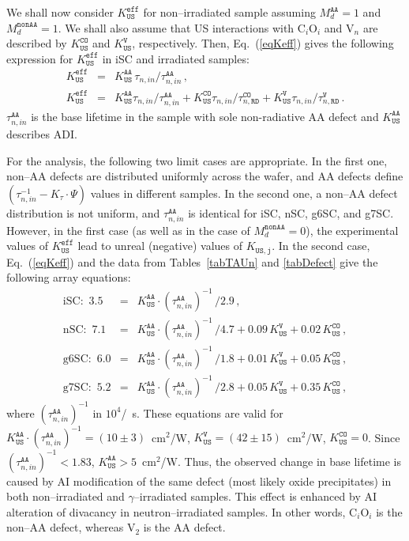 \documentclass[aip,jap, amsmath,amssymb,reprint]{revtex4-1}
\begin{document}
We shall now consider $K_\mathtt{US}^\mathtt{eff}$ for non--irradiated sample assuming $M_d^\mathtt{AA}=1$ and $M_d^\mathtt{nonAA}=1$.
We shall also assume that US interactions with C$_i$O$_i$ and V$_n$ are described by $K_\mathtt{US}^\mathtt{CO}$ and $K_\mathtt{US}^\mathtt{V}$, respectively.
Then, Eq.~(\ref{eqKeff}) gives the following expression for $K_\mathtt{US}^\mathtt{eff}$
in iSC and irradiated samples:
\begin{eqnarray}
K_\mathtt{US}^\mathtt{eff}&=&K_\mathtt{US}^\mathtt{AA}\,\tau_{n,in}/\tau_{n,in}^\mathtt{AA}\,,\nonumber\\
K_\mathtt{US}^\mathtt{eff}&=&K_\mathtt{US}^\mathtt{AA}\tau_{n,in}/\tau_{n,in}^\mathtt{AA}+
                           K_\mathtt{US}^\mathtt{CO}\tau_{n,in}/\tau_{n,\mathtt{RD}}^\mathtt{CO}+
                           K_\mathtt{US}^\mathtt{V}\tau_{n,in}/\tau_{n,\mathtt{RD}}^\mathtt{V} \,.\nonumber
\end{eqnarray}
$\tau_{n,in}^\mathtt{AA}$ is the base lifetime in the sample with sole non-radiative AA defect and $K_\mathtt{US}^\mathtt{AA}$ describes ADI.


For the analysis, the following two limit cases are appropriate.
In the first one, non--AA defects are distributed uniformly across the wafer, and
AA defects define $(\tau_{n,in}^{-1}-K_\tau\cdot\Psi)$ values in different samples.
In the second one, a non--AA defect distribution is not uniform,
 and  $\tau_{n,in}^\mathtt{AA}$ is identical for iSC, nSC, g6SC, and g7SC.
However, in the first case (as well as in the case of $M_d^\mathtt{nonAA}=0$),
the experimental values of $K_\mathtt{US}^\mathtt{eff}$ lead to unreal (negative) values of $K_\mathtt{US,j}$.
In the second case, Eq.~(\ref{eqKeff}) and the data from Tables~\ref{tabTAUn} and \ref{tabDefect} give the following array equations:
\begin{eqnarray}
\mbox{iSC}:\,\,3.5&=&K_\mathtt{US}^\mathtt{AA}\cdot(\tau_{n,in}^\mathtt{AA})^{-1}\,/2.9\,,\nonumber\\
\mbox{nSC}:\,\,7.1&=&K_\mathtt{US}^\mathtt{AA}\cdot(\tau_{n,in}^\mathtt{AA})^{-1}\,/4.7+0.09\,K_\mathtt{US}^\mathtt{V}+0.02\,K_\mathtt{US}^\mathtt{CO}\,,\nonumber\\
\mbox{g6SC}:\,\,6.0&=&K_\mathtt{US}^\mathtt{AA}\cdot(\tau_{n,in}^\mathtt{AA})^{-1}\,/1.8+0.01\,K_\mathtt{US}^\mathtt{V}+0.05\,K_\mathtt{US}^\mathtt{CO}\,,\nonumber\\
\mbox{g7SC}:\,\,5.2&=&K_\mathtt{US}^\mathtt{AA}\cdot(\tau_{n,in}^\mathtt{AA})^{-1}\,/2.8+0.05\,K_\mathtt{US}^\mathtt{V}+0.35\,K_\mathtt{US}^\mathtt{CO}\,,\nonumber
\end{eqnarray}
where
$(\tau_{n,in}^\mathtt{AA})^{-1}$ in $10^4$/~s.
These equations are valid for
$K_\mathtt{US}^\mathtt{AA}\cdot(\tau_{n,in}^\mathtt{AA})^{-1}=(10\pm3)$~cm$^2$/W,
$K_\mathtt{US}^\mathtt{V}=(42\pm15)$~cm$^2$/W,
$K_\mathtt{US}^\mathtt{CO}=0$.
Since $(\tau_{n,in}^\mathtt{AA})^{-1}<1.83$, $K_\mathtt{US}^\mathtt{AA}>5$~cm$^2$/W.
Thus, the observed change in base lifetime is caused by AI modification of the same defect (most likely oxide precipitates) in
both non--irradiated and $\gamma$--irradiated samples.
This effect is enhanced by AI alteration of divacancy in neutron--irradiated samples.
In other words, C$_i$O$_i$ is the non--AA defect, whereas V$_2$ is the AA defect.
\end{document}
